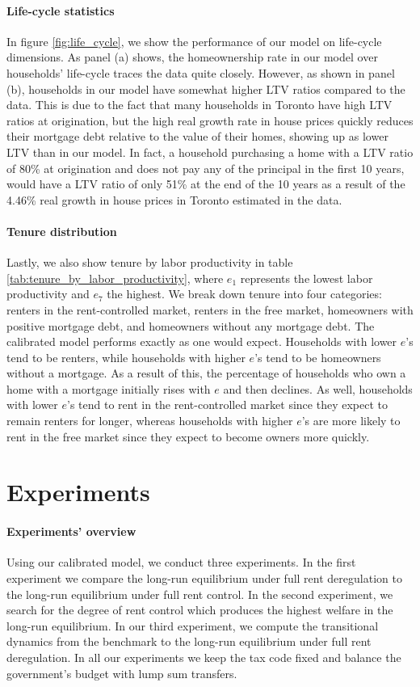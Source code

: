\documentclass[parskip=full]{article}
\begin{document}
\paragraph{Life-cycle statistics} In figure \ref{fig:life_cycle}, we show the performance of our model on life-cycle dimensions. As panel (a) shows, the homeownership rate in our model over households' life-cycle traces the data quite closely. However, as shown in panel (b), households in our model have somewhat higher LTV ratios compared to the data. This is due to the fact that many households in Toronto have high LTV ratios at origination, but the high real growth rate in house prices quickly reduces their mortgage debt relative to the value of their homes, showing up as lower LTV than in our model. In fact, a household purchasing a home with a LTV ratio of 80\% at origination and does not pay any of the principal in the first 10 years, would have a LTV ratio of only 51\% at the end of the 10 years as a result of the 4.46\% real growth in house prices in Toronto estimated in the data. 

\paragraph{Tenure distribution} Lastly, we also show tenure by labor productivity in table \ref{tab:tenure_by_labor_productivity}, where $e_{1}$ represents the lowest labor productivity and $e_{7}$ the highest. We break down tenure into four categories: renters in the rent-controlled market, renters in the free market, homeowners with positive mortgage debt, and homeowners without any mortgage debt. The calibrated model performs exactly as one would expect. Households with lower $e$'s tend to be renters, while households with higher $e$'s tend to be homeowners without a mortgage. As a result of this, the percentage of households who own a home with a mortgage initially rises with $e$ and then declines. As well, households with lower $e$'s tend to rent in the rent-controlled market since they expect to remain renters for longer, whereas households with higher $e$'s are more likely to rent in the free market since they expect to become owners more quickly. 

\section{Experiments}\label{section:experiments}

\paragraph{Experiments' overview} Using our calibrated model, we conduct three experiments. In the first experiment we compare the long-run equilibrium under full rent deregulation to the long-run equilibrium under full rent control. In the second experiment, we search for the degree of rent control which produces the highest welfare in the long-run equilibrium. In our third experiment, we compute the transitional dynamics from the benchmark to the long-run equilibrium under full rent deregulation. In all our experiments we keep the tax code fixed and balance the government's budget with lump sum transfers. 
\end{document}
